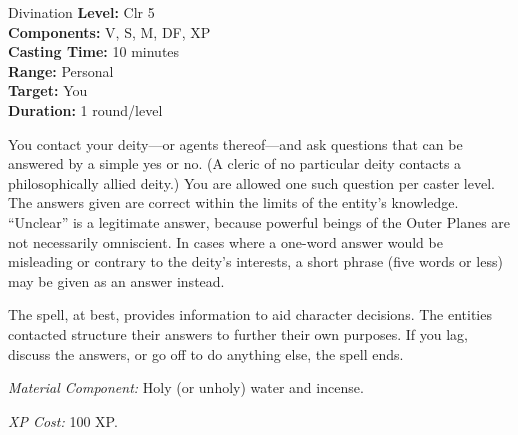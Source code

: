 {Divination}
{
	\textbf{Level:}
	Clr 5\\
	\textbf{Components:}
	V, S, M, DF, XP\\
	\textbf{Casting Time:}
	10 minutes\\
	\textbf{Range:}
	Personal\\
	\textbf{Target:}
	You\\
	\textbf{Duration:}
	1 round/level\\
}
{
	You contact your deity---or agents thereof---and ask questions that can be answered by a simple yes or no. (A cleric of no particular deity contacts a philosophically allied deity.) You are allowed one such question per caster level. The answers given are correct within the limits of the entity's knowledge. ``Unclear'' is a legitimate answer, because powerful beings of the Outer Planes are not necessarily omniscient. In cases where a one-word answer would be misleading or contrary to the deity's interests, a short phrase (five words or less) may be given as an answer instead.

	The spell, at best, provides information to aid character decisions. The entities contacted structure their answers to further their own purposes. If you lag, discuss the answers, or go off to do anything else, the spell ends.

	\textit{Material Component:}
	Holy (or unholy) water and incense.

	\textit{XP Cost:}
	100 XP.

}
